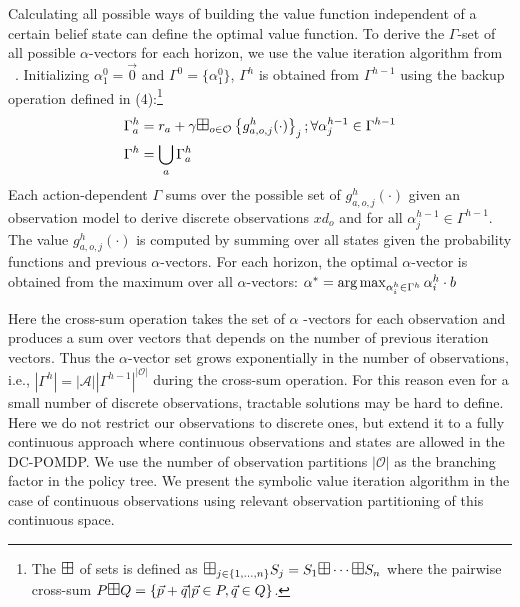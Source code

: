 \documentclass{article} %
\def\argmax{\operatornamewithlimits{arg\max}}
\begin{document}
Calculating all possible ways of building the value function independent of a certain belief state can define the optimal value function. To derive the $\Gamma$-set of all possible $\alpha$-vectors for each horizon, we use the value iteration algorithm from ~\cite{monahan82}. 
Initializing  $\alpha^0_1 = \vec{0}$ and $\Gamma^0 = \{ \alpha^0_1 \}$, $\Gamma^h$ is obtained from $\Gamma^{h-1}$ using the backup operation defined in (4):\footnote{The $\textrm{\large $\boxplus$}$ of sets is defined as 
$\textrm{\large $\boxplus$}_{j \in \{ 1,\ldots, n \} } S_j = S_1 \textrm{\large $\boxplus$} \cdots \textrm{\large $\boxplus$} S_n$ where the pairwise cross-sum $P 
\textrm{\large $\boxplus$} Q = \{ \vec{p} + \vec{q} | \vec{p} \in P, \vec{q} \in Q \}$.}
\begin{align}
\Gamma^{h}_a   &= r_a + \gamma \textrm{\large $\boxplus$}_{o \in \mathcal{O}} \left\{ g^h_{a,o,j}(\cdot) \right\}_j ;  \forall \alpha^{h-1}_{j} \in \Gamma^{h-1}  \\
\Gamma^h  &= \bigcup_a \Gamma^h_a 
\end{align}
Each action-dependent $\Gamma$ sums over the possible set of $g^h_{a,o,j}(\cdot)$ given an observation model to derive discrete observations $xd_o$ and for all $\alpha^{h-1}_{j} \in \Gamma^{h-1} $. The value $g^h_{a,o,j}(\cdot)$ is computed by summing over all states given the probability functions and previous $\alpha$-vectors.  
For each horizon, the optimal $\alpha$-vector is obtained from the maximum over all $\alpha$-vectors: 
$\alpha^* = \argmax_{\alpha^h_i \in \Gamma^h} \alpha^h_i \cdot b $

Here the cross-sum operation takes the set of $\alpha$ -vectors for each observation and produces a sum over vectors that depends on the number of previous iteration vectors. Thus the $\alpha$-vector set grows exponentially in the number of observations, i.e., $|\Gamma^{h}| = |\mathcal{A}||\Gamma^{h-1}|^{|\mathcal{O}|}$ during the cross-sum operation. For this reason even for a small number of discrete observations, tractable solutions may be hard to define. Here we do not restrict our observations to discrete ones, but extend it to a fully continuous approach where continuous observations and states are allowed in the DC-POMDP. We use the number of  observation partitions $|\mathcal{O}|$ as the branching factor in the policy tree. We present the symbolic value iteration algorithm in the case of continuous observations using relevant observation partitioning of this continuous space. 
\end{document}
